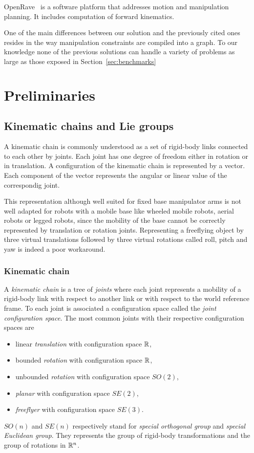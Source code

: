 OpenRave~\cite{diankov_thesis} is
a software platform that addresses motion and manipulation planning. It includes
computation of forward kinematics.

One of the main differences between our solution and the previously cited ones resides in the way manipulation constraints are compiled into a graph. To our knowledge none of the previous solutions can handle a variety of problems as large as those exposed in Section~\ref{sec:benchmarks}

\section{Preliminaries}\label{partie:preliminary}
\subsection{Kinematic chains and Lie groups}

A kinematic chain is commonly understood as a set of rigid-body links connected
to each other by joints. Each joint has one degree of freedom either in
rotation or in translation. A configuration of the kinematic chain is represented by a vector. Each component of the vector represents the angular or linear value of the correspondig joint.

This representation although well suited for fixed base manipulator
arms is not well adapted for robots with a mobile base like wheeled
mobile robots, aerial robots or legged robots, since the mobility of the base
cannot be correctly represented by translation or rotation joints.
Representing a freeflying object by three virtual translations followed by
three virtual rotations called roll, pitch and yaw is indeed a poor workaround.

\subsubsection{Kinematic chain}

A \textit{kinematic chain} is a tree of \textit{joints} where each
joint represents a mobility of a rigid-body link with respect to
another link or with respect to the world reference frame. To each joint is
associated a configuration space called the \textit{joint configuration space}.
The most common joints with their respective configuration spaces are
\begin{itemize}
\item linear \textit{translation} with configuration space $\mathbb{R}$,
\item bounded \textit{rotation} with configuration space  $\mathbb{R}$,
\item unbounded \textit{rotation} with configuration space  $SO(2)$,
\item \textit{planar} with configuration space $SE(2)$,
\item \textit{freeflyer} with configuration space $SE(3)$.
\end{itemize}
$SO(n)$ and $SE(n)$ respectively stand for \textit{special orthogonal group} and \textit{special Euclidean group}. They represents the group of rigid-body transformations and the group of rotations in $\mathbb{R}^n$.

